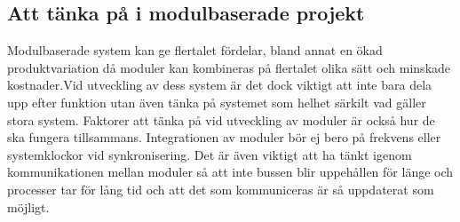 \documentclass[11pt]{article}
\begin{document}
\begin{flushleft}
\subsection{Att tänka på i modulbaserade projekt}


Modulbaserade system  kan ge flertalet fördelar, bland annat en ökad produktvariation då moduler kan kombineras på flertalet olika sätt och minskade kostnader.Vid utveckling av dess system är det dock viktigt att inte bara dela upp efter funktion utan även tänka på systemet som helhet särkilt vad gäller stora system. Faktorer att tänka på vid utveckling av moduler är också hur de ska fungera tillsammans. Integrationen av moduler bör ej bero på frekvens eller systemklockor vid synkronisering. Det är även viktigt att ha tänkt igenom kommunikationen mellan moduler så att inte bussen blir uppehållen för länge och processer tar för lång tid och att det som kommuniceras är så uppdaterat som möjligt.



\pagebreak
{}




\end{flushleft}
\end{document}
